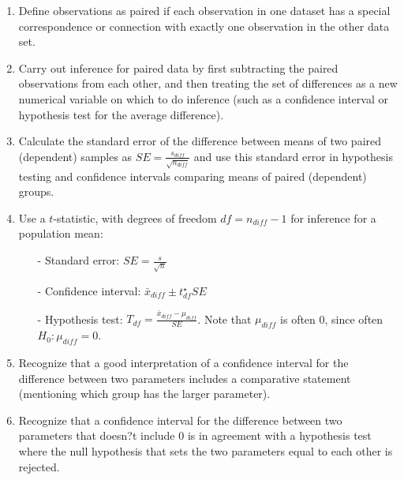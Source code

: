 \documentclass[11pt]{article}
\begin{document}
%

\vspace{0.48cm}

%

\begin{enumerate}[resume]
\renewcommand\labelenumi{\textcolor{light}{\textbf{LO \theenumi.}}}

\item Define observations as paired if each observation in one dataset has a special correspondence or connection with exactly one observation in the other data set. 

\item Carry out inference for paired data by first subtracting the paired observations from each other, and then treating the set of differences as a new numerical variable on which to do inference (such as a confidence interval or hypothesis test for the average difference). 

\item Calculate the standard error of the difference between means of two paired (dependent) samples as $SE = \frac{s_{diff}}{\sqrt{n_{diff}}}$ and use this standard error in hypothesis testing and confidence intervals comparing means of paired (dependent) groups. 

\item Use a $t$-statistic, with degrees of freedom $df = n_{diff} - 1$ for inference for a population mean:
\begin{itemize}
\item[-] Standard error: $SE = \frac{s}{\sqrt{n}}$
\item[-] Confidence interval: $\bar{x}_{diff} \pm t_{df}^\star SE$
\item[-] Hypothesis test: $T_{df} = \frac{\bar{x}_{diff} - \mu_{diff}}{SE}$. Note that $\mu_{diff}$ is often 0, since often $H_0: \mu_{diff} = 0$.
\end{itemize}

\item Recognize that a good interpretation of a confidence interval for the difference between two parameters includes a comparative statement (mentioning which group has the larger parameter). 

\item Recognize that a confidence interval for the difference between two parameters that doesn?t include 0 is in agreement with a hypothesis test where the null hypothesis that sets the two parameters equal to each other is rejected. 

\end{enumerate}
\end{document}
